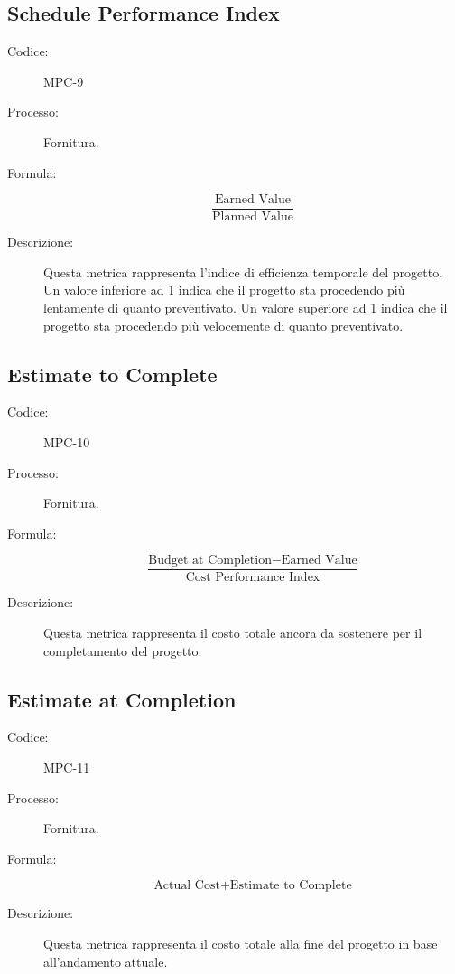 \subsection{Schedule Performance Index}
\begin{description}
    \item[Codice:] MPC-9
    \item[Processo:] Fornitura.
    \item[Formula:]
    \begin{equation}
        \frac{\text{Earned Value}}{\text{Planned Value}}
    \end{equation}
    \item[Descrizione:] Questa metrica rappresenta l'indice di efficienza temporale del progetto. Un valore inferiore ad 1 indica che il progetto sta procedendo più lentamente di quanto preventivato. Un valore superiore ad 1 indica che il progetto sta procedendo più velocemente di quanto preventivato.
\end{description}

\subsection{Estimate to Complete}
\begin{description}
    \item[Codice:] MPC-10
    \item[Processo:] Fornitura.
    \item[Formula:] 
    \begin{equation}
        \frac{\text{Budget at Completion} - \text{Earned Value}}{\text{Cost Performance Index}}
    \end{equation}
    \item[Descrizione:] Questa metrica rappresenta il costo totale ancora da sostenere per il completamento del progetto.
\end{description}

\subsection{Estimate at Completion}
\begin{description}
    \item[Codice:] MPC-11
    \item[Processo:] Fornitura.
    \item[Formula:]
    \begin{equation}
        \text{Actual Cost} + \text{Estimate to Complete}
    \end{equation}
    \item[Descrizione:] Questa metrica rappresenta il costo totale alla fine del progetto in base all'andamento attuale.
\end{description}

